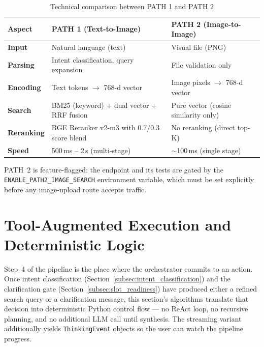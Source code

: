 \begin{table}[H]
\centering
\begin{tabular}{p{2cm}p{4.7cm}p{4.7cm}}
\toprule
\textbf{Aspect} & \textbf{PATH 1 (Text-to-Image)} & \textbf{PATH 2 (Image-to-Image)}\\
\midrule
\textbf{Input}    & Natural language (text)                       & Visual file (PNG)\\
\textbf{Parsing}  & Intent classification, query expansion        & File validation only\\
\textbf{Encoding} & Text tokens $\rightarrow$ 768-d vector        & Image pixels $\rightarrow$ 768-d vector\\
\textbf{Search}   & BM25 (keyword) + dual vector + RRF fusion     & Pure vector (cosine similarity only)\\
\textbf{Reranking}& BGE Reranker v2-m3 with $0.7/0.3$ score blend & No reranking (direct top-K)\\
\textbf{Speed}    & 500\,ms -- 2\,s (multi-stage)                 & $\sim$100\,ms (single stage)\\
\bottomrule
\end{tabular}
\caption{Technical comparison between PATH 1 and PATH 2}
\label{tab:path_comparison}
\end{table}

PATH~2 is feature-flagged: the endpoint and its tests are gated by the \texttt{ENABLE\_\allowbreak PATH2\_\allowbreak IMAGE\_\allowbreak SEARCH} environment variable, which must be set explicitly before any image-upload route accepts traffic.


\section{Tool-Augmented Execution and Deterministic Logic}

Step~4 of the pipeline is the place where the orchestrator commits to an action. Once intent classification (Section~\ref{subsec:intent_classification}) and the clarification gate (Section~\ref{subsec:slot_readiness}) have produced either a refined search query or a clarification message, this section's algorithms translate that decision into deterministic Python control flow --- no ReAct loop, no recursive planning, and no additional LLM call until synthesis. The streaming variant additionally yields \texttt{ThinkingEvent} objects so the user can watch the pipeline progress.

